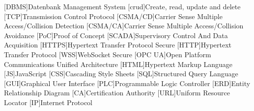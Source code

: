 \begin{multicols}{2}
  \begin{acronym}
  [DBMS]{Datenbank Management  System}
  [crud]{Create, read, update and delete}
  [TCP]{Transmission Control Protocol}
  [CSMA/CD]{Carrier Sense Multiple Access/Collision Detection}
  [CSMA/CA]{Carrier Sense Multiple Access/Collision Avoidance}
  [PoC]{Proof of Concept}
  [SCADA]{Supervisory Control And Data Acquisition}
  [HTTPS]{Hypertext Transfer Protocol Secure}
  [HTTP]{Hypertext Transfer Protocol}
  [WSS]{WebSocket Secure}
  [OPC UA]{Open Platform Communications Unified Architecture}
  [HTML]{Hypertext Markup Language}
  [JS]{JavaScript}
  [CSS]{Cascading Style Sheets}
  [SQL]{Structured Query Language}
  [GUI]{Graphical User Interface}
  [PLC]{Programmable Logic Controller}
  [ERD]{Entity Relationship Diagram}
  [CA]{Certification Authority}
  [URL]{Uniform Resource Locator}
  [IP]{Internet Protocol}
\end{acronym}
\end{multicols}

